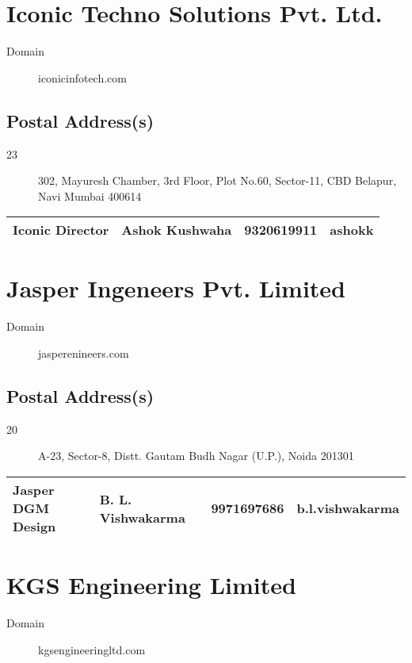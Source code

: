 \documentclass[a4paper, 11pt, twoside]{book}
\begin{document}
\section{Iconic Techno Solutions Pvt. Ltd.}\label{com:23}
\begin{description}
\item[Domain]iconicinfotech.com
\end{description}
\subsection*{Postal Address(s)}
\begin{description}
\item [23]302, Mayuresh Chamber, 3rd Floor, Plot No.60, Sector-11, CBD Belapur, Navi Mumbai 400614
\end{description}
\begin{tabular}{|p{4cm}|p{2cm}|p{2cm}|p{3cm}|}
\hline
Iconic Director & Ashok Kushwaha & 9320619911 & ashokk \\ \hline
\end{tabular}
\section{Jasper Ingeneers Pvt. Limited}\label{com:21}
\begin{description}
\item[Domain]jasperenineers.com
\end{description}
\subsection*{Postal Address(s)}
\begin{description}
\item [20]A-23, Sector-8, Distt. Gautam Budh Nagar (U.P.), Noida 201301
\end{description}
\begin{tabular}{|p{4cm}|p{2cm}|p{2cm}|p{3cm}|}
\hline
Jasper DGM Design & B. L. Vishwakarma & 9971697686 & b.l.vishwakarma \\ \hline
\end{tabular}
\section{KGS Engineering Limited}\label{com:26}
\begin{description}
\item[Domain]kgsengineeringltd.com
\end{description}
\end{document}
